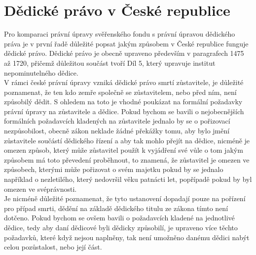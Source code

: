 \documentclass{article}
\begin{document}



\newpage
\section{Dědické právo v České republice}

Pro komparaci právní úpravy svěřenského fondu s právní úpravou dědického práva je v první řadě důležité popsat jakým způsobem v České republice funguje dědické právo. Dědické právo je obecně upraveno především v paragrafech 1475 až 1720, přičemž důležitou součást tvoří Díl 5, který upravuje institut nepominutelného dědice. \\

V rámci české právní úpravy vzniká dědické právo smrtí zůstavitele, je důležité poznamenat, že ten kdo zemře společně se zůstavitelem, nebo před ním, není způsobilý dědit. S ohledem na toto je vhodné poukázat na formální požadavky právní úpravy na zůstavitele a dědice. Pokud bychom se bavili o nejobecnějších formálních požadavcích kladených na zůstavitele jednalo by se o pořizovací nezpůsobilost, obecně zákon neklade žádné překážky tomu, aby bylo jmění zůstavitele součástí dědického řízení a aby tak mohlo přejít na dědice, nicméně je omezen způsob, který může zůstavitel použít k vyjádření své vůle o tom jakým způsobem má toto převedení proběhnout, to znamená, že zůstavitel je omezen ve způsobech, kterými může pořizovat o svém majetku pokud by se jednalo například o nezletilého, který nedovršil věku patnácti let, popřípadě pokud by byl omezen ve svéprávnosti. \\

Je nicméně důležité poznamenat, že tyto ustanovení dopadají pouze na pořízení pro případ smrti, dědění na základě dědického titulu ze zákona tímto není dotčeno. Pokud bychom se ovšem bavili o požadavcích kladené na jednotlivé dědice, tedy aby daní dědicové byli dědicky způsobilí, je upraveno více těchto požadavků, které když nejsou naplněny, tak není umožněno danému dědici nabýt celou pozůstalost, nebo její část. \\
\end{document}
